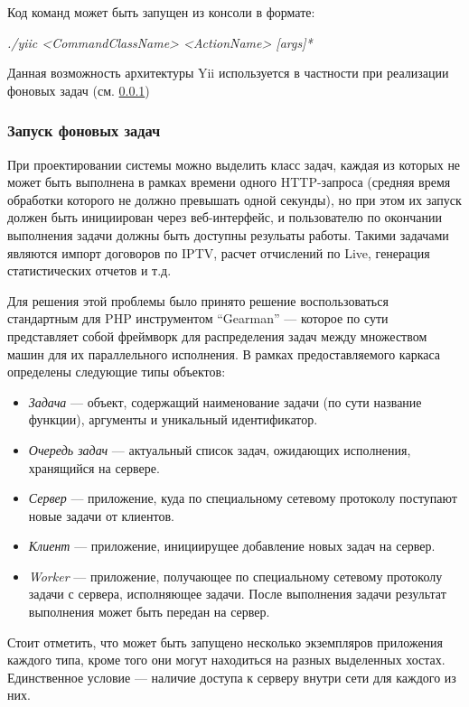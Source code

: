 Код команд может быть запущен из консоли в формате:

\textit{./yiic <CommandClassName> <ActionName> [args]*}

Данная возможность архитектуры Yii используется в частности при реализации фоновых задач (см. \ref{task:background}) 

\subsubsection{Запуск фоновых задач}
\label{task:background}
При проектировании системы можно выделить класс задач, каждая из которых
не может быть выполнена в рамках времени одного HTTP-запроса (средняя время обработки которого
не должно превышать одной секунды), но при этом их запуск должен быть инициирован через веб-интерфейс, и
пользователю по окончании выполнения задачи должны быть доступны резульаты работы. Такими задачами являются
импорт договоров по IPTV, расчет отчислений по Live, генерация статистических отчетов и т.д.

Для решения этой проблемы было принято решение воспользоваться стандартным для PHP инструментом 
``Gearman''\cite{gearman} --- которое по сути представляет собой фреймворк для распределения задач между множеством
машин для их параллельного исполнения. В рамках предоставляемого каркаса определены следующие типы объектов:
\begin{itemize}
\item{
  \textit{Задача} --- объект, содержащий наименование задачи (по сути название функции), аргументы и уникальный идентификатор.
}
\item{
  \textit{Очередь задач} --- актуальный список задач, ожидающих исполнения, хранящийся на сервере.
}
\item{
  \textit{Сервер} --- приложение, куда по специальному сетевому протоколу поступают новые задачи от клиентов.
}
\item{
  \textit{Клиент} --- приложение, инициирущее добавление новых задач на сервер.
}
\item{
  \textit{Worker} --- приложение, получающее по специальному сетевому протоколу задачи с сервера,
исполняющее задачи. После выполнения задачи результат выполнения может быть передан на сервер.
}
\end{itemize}

Стоит отметить, что может быть запущено несколько экземпляров приложения каждого типа, кроме того они могут находиться
на разных выделенных хостах. Единственное условие --- наличие доступа к серверу внутри сети для каждого из них.

